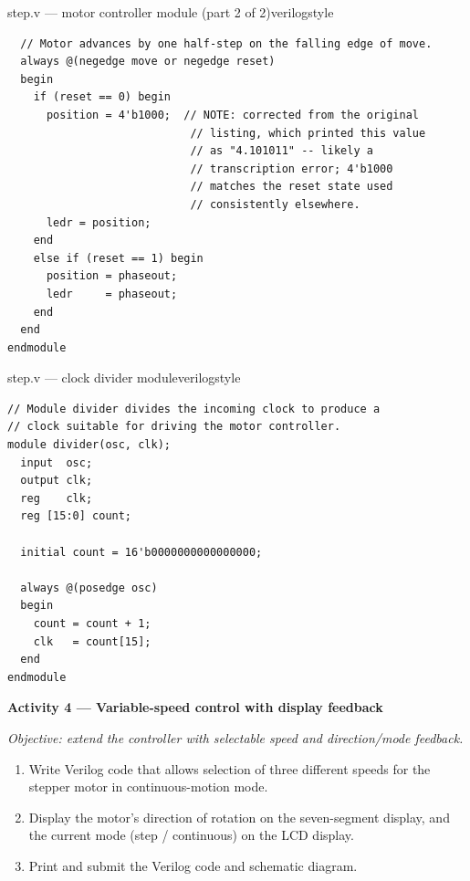 \begin{procedure}
  \begin{codepanel}{step.v --- motor controller module (part 2 of 2)}{verilogstyle}
    \begin{lstlisting}
  // Motor advances by one half-step on the falling edge of move.
  always @(negedge move or negedge reset)
  begin
    if (reset == 0) begin
      position = 4'b1000;  // NOTE: corrected from the original
                            // listing, which printed this value
                            // as "4.101011" -- likely a
                            // transcription error; 4'b1000
                            // matches the reset state used
                            // consistently elsewhere.
      ledr = position;
    end
    else if (reset == 1) begin
      position = phaseout;
      ledr     = phaseout;
    end
  end
endmodule
\end{lstlisting}
  \end{codepanel}
  \vspace{-4pt}

  \begin{codepanel}{step.v --- clock divider module}{verilogstyle}
    \begin{lstlisting}
// Module divider divides the incoming clock to produce a
// clock suitable for driving the motor controller.
module divider(osc, clk);
  input  osc;
  output clk;
  reg    clk;
  reg [15:0] count;

  initial count = 16'b0000000000000000;

  always @(posedge osc)
  begin
    count = count + 1;
    clk   = count[15];
  end
endmodule
\end{lstlisting}
  \end{codepanel}
  \vspace{-4pt}
  \vspace{1.5em}

  \textbf{Activity 4 --- Variable-speed control with display feedback}\vspace{2pt}

  \textit{Objective: extend the controller with selectable speed and direction/mode feedback.}

  \begin{enumerate}
    \item Write Verilog code that allows selection of three different speeds for the stepper motor in continuous-motion mode.
    \item Display the motor's direction of rotation on the seven-segment display, and the current mode (step / continuous) on the LCD display.
    \item Print and submit the Verilog code and schematic diagram.
  \end{enumerate}

\end{procedure}

